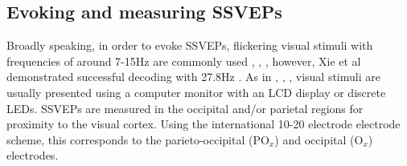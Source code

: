 \subsection{Evoking and measuring SSVEPs}

Broadly speaking, in order to evoke SSVEPs, flickering visual stimuli with frequencies of around 7-15Hz are commonly used \cite{Acampora2021}, \cite{Chen2017}, \cite{duart-comparing-ssvep-stimuli}, however, Xie et al demonstrated successful decoding with 27.8Hz \cite{Xie2016}. As in \cite{Acampora2021}, \cite{Chen2017}, \cite{autthasan-single-chan-ssvep}, visual stimuli are usually presented using a computer monitor with an LCD display or discrete LEDs. SSVEPs are measured in the occipital and/or parietal regions \cite{Fernandez-Fraga2016} for proximity to the visual cortex. Using the international 10-20 electrode electrode scheme, this corresponds to the parieto-occipital ($\text{PO}_x$) and occipital ($\text{O}_x$)  electrodes.

